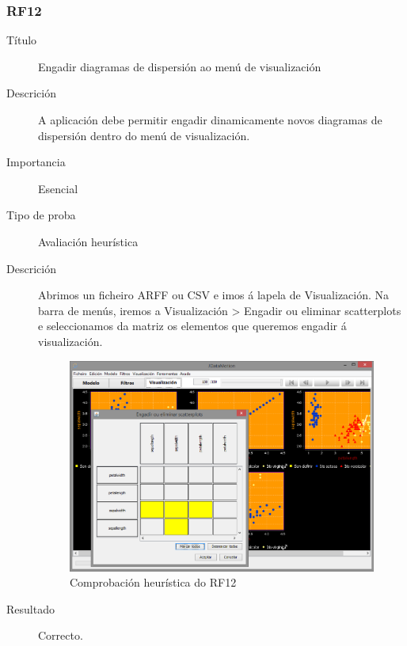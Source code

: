 \subsubsection*{RF12}
\begin{description}
\item[Título] \hfill
Engadir diagramas de dispersión ao menú de visualización
\item[Descrición] \hfill
A aplicación debe permitir engadir dinamicamente novos diagramas de dispersión dentro do menú de visualización.
\item[Importancia] \hfill
Esencial
\item[Tipo de proba] \hfill
Avaliación heurística
\item[Descrición]
Abrimos un ficheiro ARFF ou CSV e imos á lapela de Visualización. Na barra de menús, iremos a Visualización \textgreater{} Engadir ou eliminar scatterplots e seleccionamos da matriz os elementos que queremos engadir á visualización.
\begin{figure}
\centering
\includegraphics[width=\textwidth,height=\textheight,keepaspectratio]{figuras/RF1213}
\caption{Comprobación heurística do RF12}
\label{RF1213}
\end{figure}
\item[Resultado]
Correcto.
\end{description}

